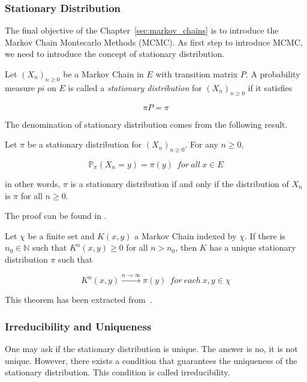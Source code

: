 \documentclass{article}
\begin{document}
\subsubsection{Stationary Distribution}
\label{sec:stationary_distribution}

The final objective of the Chapter~\ref{sec:markov_chains} is to introduce the Markov Chain Montecarlo Methods (MCMC). As first step to introduce MCMC, we need to introduce the concept of stationary distribution. 

\begin{definition}
	Let $(X_n)_{n \geq 0}$ be a Markov Chain in $E$ with transition matrix $P$. A probability measure $pi$ on $E$ is called a \textit{stationary distribution} for $(X_n)_{n \geq 0}$ if it satisfies 
	
	\[
		\pi P = \pi
	\]
\end{definition}

The denomination of stationary distribution comes from the following result.

\begin{proposition}
	Let $\pi$ be a stationary distribution for $(X_n)_{n \geq 0}$. For any \(n \geq 0\),

	\[
		\mathbb{P}_\pi(X_n = y) = \pi(y) \ \ for \ all \ x \in E
	\]

	in other words, $\pi$ is a stationary distribution if and only if the distribution of $X_n$ is $\pi$ for all $n \geq 0$.
\end{proposition}

The proof can be found in \cite{diaconis2008markov}.

\begin{theorem}
	Let \(\chi\) be a finite set and \(K(x,y)\) a Markov Chain indexed by $\chi$. If there is $n_0 \in \mathbb{N}$ such that \(K^n(x,y) \geq 0\) for all \(n > n_0\), then $K$ has a unique stationary distribution $\pi$ such that

	\[
		K^n(x,y) \xrightarrow{n \to \infty} \pi(y) \  \ for \ each \ x, y \in \chi
	\]
\end{theorem}

This theorem has been extracted from~\cite{reygner2023methodes}. 

\subsubsection{Irreducibility and Uniqueness}

One may ask if the stationary distribution is unique. The answer is no, it is not unique. However, there exists a condition that guarantees the uniqueness of the stationary distribution. This condition is called irreducibility. 
\end{document}
